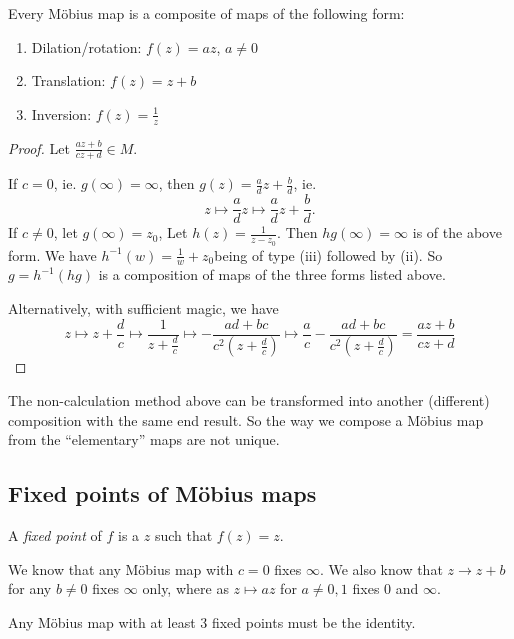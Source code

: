 \documentclass[a4paper]{article}
\begin{document}
  \begin{prop}
    Every M\"obius map is a composite of maps of the following form:
    \begin{enumerate}
      \item Dilation/rotation: $f(z) = az$, $a\not= 0$
      \item Translation: $f(z) = z + b$
      \item Inversion: $f(z) = \frac{1}{z}$
    \end{enumerate}
  \end{prop}
  \begin{proof}
    Let $\frac{az + b}{cz + d}\in M$.

    If $c = 0$, ie. $g(\infty) = \infty$, then $g(z) = \frac{a}{d}z + \frac{b}{d}$, ie.
    \[
      z\mapsto \frac{a}{d} z\mapsto \frac{a}{d}z + \frac{b}{d}.
    \]
    If $c\not= 0$, let $g(\infty)=z_0$, Let $h(z) = \frac{1}{z - z_0}$. Then $hg(\infty) = \infty$ is of the above form. We have $h^{-1}(w) = \frac{1}{w} + z_0$being of type (iii) followed by (ii). So $g = h^{-1} (hg)$ is a composition of maps of the three forms listed above.

    Alternatively, with sufficient magic, we have
    \[
      z\mapsto z + \frac{d}{c} \mapsto \frac{1}{z + \frac{d}{c}} \mapsto -\frac{ad + bc}{c^2(z + \frac{d}{c})}\mapsto \frac{a}{c} -\frac{ad + bc}{c^2(z + \frac{d}{c})} = \frac{az + b}{cz + d}
    \]
  \end{proof}
  \note The non-calculation method above can be transformed into another (different) composition with the same end result. So the way we compose a M\"obius map from the ``elementary'' maps are not unique.

  \subsection{Fixed points of M\"obius maps}
  \begin{defi}
    A \emph{fixed point} of $f$ is a $z$ such that $f(z) = z$.
  \end{defi}

  We know that any M\"obius map with $c = 0$ fixes $\infty$. We also know that $z\to z + b$ for any $b\not= 0$ fixes $\infty$ only, where as $z\mapsto az$ for $a\not= 0, 1$ fixes $0$ and $\infty$.

  \begin{prop}
    Any M\"obius map with at least 3 fixed points must be the identity. 
  \end{prop}
\end{document}
